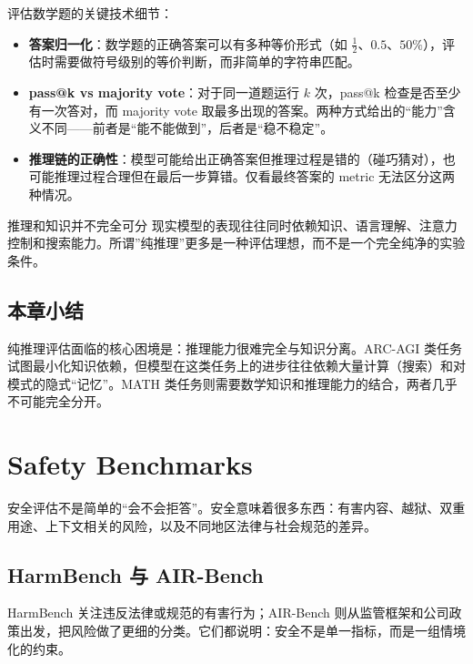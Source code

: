 \documentclass[a4paper]{article}
\begin{document}
评估数学题的关键技术细节：
\begin{itemize}
    \item \textbf{答案归一化}：数学题的正确答案可以有多种等价形式（如 $\frac{1}{2}$、$0.5$、$50\%$），评估时需要做符号级别的等价判断，而非简单的字符串匹配。
    \item \textbf{pass@k vs majority vote}：对于同一道题运行 $k$ 次，pass@k 检查是否至少有一次答对，而 majority vote 取最多出现的答案。两种方式给出的``能力''含义不同——前者是``能不能做到''，后者是``稳不稳定''。
    \item \textbf{推理链的正确性}：模型可能给出正确答案但推理过程是错的（碰巧猜对），也可能推理过程合理但在最后一步算错。仅看最终答案的 metric 无法区分这两种情况。
\end{itemize}

\begin{knowledgebox}{推理和知识并不完全可分}
现实模型的表现往往同时依赖知识、语言理解、注意力控制和搜索能力。所谓”纯推理”更多是一种评估理想，而不是一个完全纯净的实验条件。
\end{knowledgebox}

\subsection{本章小结}

纯推理评估面临的核心困境是：推理能力很难完全与知识分离。ARC-AGI 类任务试图最小化知识依赖，但模型在这类任务上的进步往往依赖大量计算（搜索）和对模式的隐式``记忆''。MATH 类任务则需要数学知识和推理能力的结合，两者几乎不可能完全分开。

\section{Safety Benchmarks}

安全评估不是简单的``会不会拒答''。安全意味着很多东西：有害内容、越狱、双重用途、上下文相关的风险，以及不同地区法律与社会规范的差异。

\subsection{HarmBench 与 AIR-Bench}

HarmBench 关注违反法律或规范的有害行为；AIR-Bench 则从监管框架和公司政策出发，把风险做了更细的分类。它们都说明：安全不是单一指标，而是一组情境化的约束。
\end{document}
